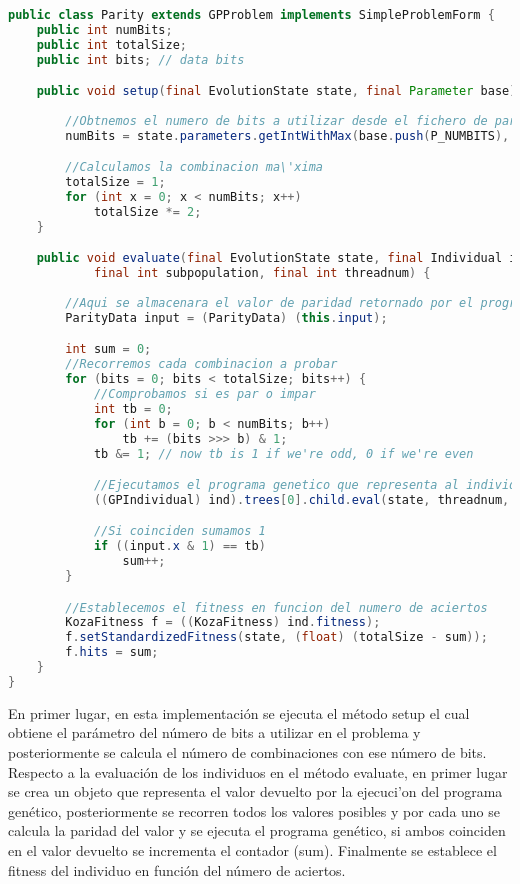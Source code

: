 \begin{lstlisting}[language=Java]
public class Parity extends GPProblem implements SimpleProblemForm {
	public int numBits;
	public int totalSize;
	public int bits; // data bits

	public void setup(final EvolutionState state, final Parameter base) {
		
		//Obtnemos el numero de bits a utilizar desde el fichero de parametros
		numBits = state.parameters.getIntWithMax(base.push(P_NUMBITS), null, 2, 31);

		//Calculamos la combinacion ma\'xima
		totalSize = 1;
		for (int x = 0; x < numBits; x++)
			totalSize *= 2;
	}

	public void evaluate(final EvolutionState state, final Individual ind,
			final int subpopulation, final int threadnum) {
		
		//Aqui se almacenara el valor de paridad retornado por el programa gen\'etico
		ParityData input = (ParityData) (this.input);

		int sum = 0;
		//Recorremos cada combinacion a probar
		for (bits = 0; bits < totalSize; bits++) {		
			//Comprobamos si es par o impar
			int tb = 0;
			for (int b = 0; b < numBits; b++)
				tb += (bits >>> b) & 1;
			tb &= 1; // now tb is 1 if we're odd, 0 if we're even

			//Ejecutamos el programa genetico que representa al individuo
			((GPIndividual) ind).trees[0].child.eval(state, threadnum, input, stack, ((GPIndividual) ind), this);

			//Si coinciden sumamos 1
			if ((input.x & 1) == tb)
				sum++;
		}

		//Establecemos el fitness en funcion del numero de aciertos
		KozaFitness f = ((KozaFitness) ind.fitness);
		f.setStandardizedFitness(state, (float) (totalSize - sum));
		f.hits = sum;
	}
}
\end{lstlisting}

En primer lugar, en esta implementación se ejecuta el método setup el cual obtiene el parámetro del n\'umero de bits a utilizar en el problema y posteriormente se calcula el n\'umero de combinaciones con ese n\'umero de bits. Respecto a la evaluación de los individuos en el método evaluate, en primer lugar se crea un objeto que representa el valor devuelto por la ejecuci'on del programa genético, posteriormente se recorren todos los valores posibles y por cada uno se calcula la paridad del valor y se ejecuta el programa gen\'etico, si ambos coinciden en el valor devuelto se incrementa el contador (sum). Finalmente se establece el fitness del individuo en funci\'on del n\'umero de aciertos.

